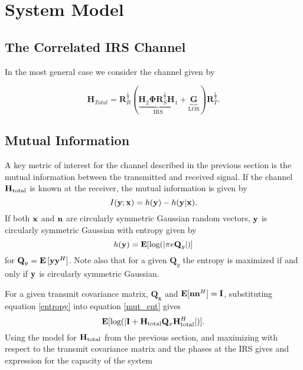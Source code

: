 \documentclass[12pt,a4paper]{report}
\begin{document}
\chapter{System Model}\label{system_model}
\section{The Correlated IRS Channel}
In the most general case we consider the channel given by 

	\begin{equation}
	\mathbf{H}_{Total} = \mathbf{R}_{R}^{\frac{1}{2}}(\underbrace{\mathbf{H}_{2}\boldsymbol{\Phi}\mathbf{R}_{S}^{\frac{1}{2}}\mathbf{H}_{1}}_{\text{IRS}} + \underbrace{\mathbf{G}}_{\text{LOS}})\mathbf{R}_{T}^{\frac{1}{2}}.
	\end{equation}

\section{Mutual Information}\label{sectiond:mut_info}
A key metric of interest for the channel described in the previous section is the mutual information between the transmitted and received signal. If the channel $\mathbf{H}_\text{total}$ is known at the receiver, the mutual information is given by 
\begin{equation}\label{mut_ent}
I(\mathbf{y};\mathbf{x}) = h(\mathbf{y}) - h(\mathbf{y}|\mathbf{x}).
\end{equation}
If both $\mathbf{x}$ and $\mathbf{n}$ are circularly symmetric Gaussian random vectors, $\mathbf{y}$ is circularly symmetric Gaussian with entropy given by \cite{telatar1999capacity} 
\begin{equation}\label{entropy}
h(\mathbf{y}) = \mathop{\bf E{}}[\text{log{}}(|\pi e \mathbf{Q}_{y}|)]
\end{equation}
 for $\mathbf{Q}_{y} = \mathop{\bf E{}}{[\mathbf{y} \mathbf{y}^H]}$. Note also that for a given $\mathbf{Q}_{y}$ the entropy is maximized if and only if $\mathbf{y}$ is circularly symmetric Gaussian.

For a given transmit covariance matrix, $\mathbf{Q_x}$ and $\mathop{\bf E{}}[\mathbf{n}\mathbf{n}^H] = \mathbf{I}$, substituting equation \eqref{entropy} into equation
\eqref{mut_ent} gives
\begin{equation}\label{mut_inf}
\mathop{\bf E{}} [\text{log{}}(|\mathbf{I} + \mathbf{H}_\text{total} \mathbf{Q}_x \mathbf{H}_\text{total}^H|)].
\end{equation}
Using the model for $\mathbf{H}_\text{total}$ from the previous section, and maximizing with respect to the
transmit covariance matrix and the phases at the IRS gives and expression for the capacity of the system
\end{document}
